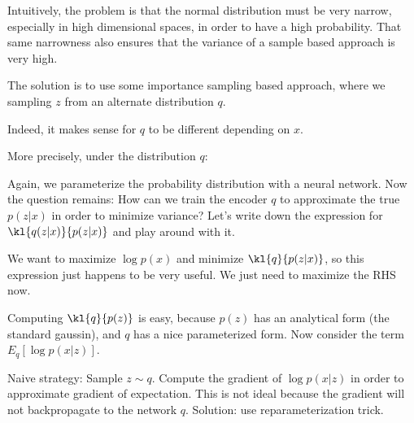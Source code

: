 \documentclass[12pt]{article}
\begin{document}

Intuitively, the problem is that the normal distribution must be very narrow, especially in high dimensional spaces, in order to have a high probability. That same narrowness also ensures that the variance of a sample based approach is very high.

The solution is to use some importance sampling based approach, where we sampling $z$ from an alternate distribution $q$. 


Indeed, it makes sense for $q$ to be different depending on $x$. 


More precisely, under the distribution $q$:


Again, we parameterize the probability distribution with a neural network. Now the question remains: How can we train the encoder $q$ to approximate the true $p(z|x)$ in order to minimize variance? Let's write down the expression for $\kl{q(z|x)}{p(z|x)}$ and play around with it.


We want to maximize $\log p(x)$ and minimize $\kl{q}{p(z|x)}$, so this expression just happens to be very useful. We just need to maximize the RHS now.

Computing $\kl{q}{p(z)}$ is easy, because $p(z)$ has an analytical form (the standard gaussin), and $q$ has a nice parameterized form. Now consider the term $E_q[\log p(x|z)]$. 

Naive strategy: Sample $z \sim q$. Compute the gradient of $\log p(x|z)$ in order to approximate gradient of expectation. This is not ideal because the gradient will not backpropagate to the network $q$. Solution: use reparameterization trick.  
\end{document}
